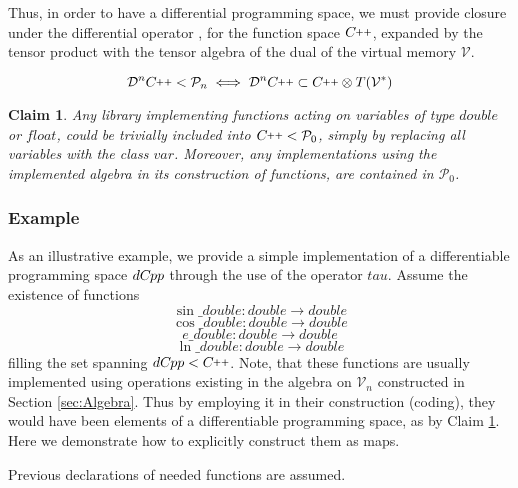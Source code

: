\documentclass{article}
\newcommand{\VV}{\mathcal{V}}
\newcommand{\CC}{C\nolinebreak\hspace{-.05em}\raisebox{.4ex}{\tiny\bf +}\nolinebreak\hspace{-.10em}\raisebox{.4ex}{\tiny\bf +}}
\def\CC{{C\nolinebreak[4]\hspace{-.05em}\raisebox{.4ex}{\tiny\bf ++}}}
\newcommand{\dP}{\mathcal{P}}
\newcommand{\DD}{\mathcal{D}}
\newcommand{\dCpp}{dC\nolinebreak\hspace{-.05em}\raisebox{.4ex}{\tiny\bf +}\nolinebreak\hspace{-.10em}\raisebox{.4ex}{\tiny\bf p}}
\def\dCpp{{dC\nolinebreak[4]\hspace{-.05em}pp}}
\newtheorem{trditev}{Claim}[section]
\begin{document}
              Thus, in order to have a differential programming space, we must provide closure under the differential operator \cite[Corollary~5.1]{OperationalCalculus}, for the function space $\CC$, expanded by the tensor product with the tensor algebra of the dual of the virtual memory $\VV$.
              
              \begin{equation}
              \DD^n\CC<\dP_n\iff\DD^n\CC\subset\CC\otimes T(\VV^*)
              \end{equation}

\begin{trditev}\label{trd:library}
Any library implementing functions acting on variables of type $double$ or $float$, could be trivially included into $\CC<\dP_0$, simply by replacing all variables with the class $var$. Moreover, any implementations using the implemented algebra in its construction of functions, are contained in $\dP_0$.
\end{trditev}

\subsubsection{Example}\label{sec:example}
  
As an illustrative example, we provide a simple implementation of a differentiable programming space $\dCpp$ through the use of the operator $tau$. 
Assume the existence of functions
\begin{equation}
\sin\_double:double\to double
\end{equation}
\begin{equation}
\cos\_double:double\to double
\end{equation} 
\begin{equation}
e\_double:double\to double
\end{equation}  
\begin{equation}
\ln\_double:double\to double
\end{equation} 
filling the set spanning $\dCpp<\CC$. Note, that these functions are usually implemented using operations existing in the algebra on $\VV_n$ constructed in Section \ref{sec:Algebra}. Thus by employing it in their construction (coding), they would have been elements of a differentiable programming space, as by Claim \ref{trd:library}. Here we demonstrate how to explicitly construct them as maps.

Previous declarations of needed functions are assumed. 
\end{document}
